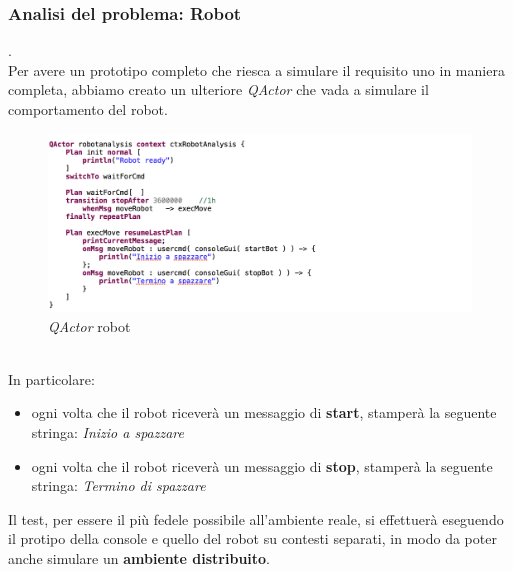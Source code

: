 \documentclass{llncs}
\newcommand{\qa}{\textsf{\textit{QActor }}}
\begin{document}
\subsubsection{Analisi del problema: Robot} .
\label{AnalisidelproblemaReq1Robot}
\vspace*{1ex}
\\
Per avere un prototipo completo che riesca a simulare il requisito uno in maniera completa, abbiamo creato un ulteriore \qa che vada a simulare il comportamento del robot.\\
\begin{figure}
    \centering
    \includegraphics[width=1\textwidth]{Immagini/Robot(requisito1).png}
    \caption{\qa robot}
    \label{fig:my_label}
\end{figure}
\vspace*{1ex}
\\
In particolare:
\begin{itemize}
    \item ogni volta che il robot ricever\`a un messaggio di \textbf{start}, stamper\`a la seguente stringa: \textit{Inizio a spazzare}
    \item ogni volta che il robot ricever\`a un messaggio di \textbf{stop}, stamper\`a la seguente stringa:
    \textit{Termino di spazzare}
\end{itemize}
Il test, per essere il pi\`u fedele possibile all'ambiente reale, si effettuer\`a eseguendo il protipo della console e quello del robot su contesti separati, in modo da poter anche simulare un \textbf{ambiente distribuito}. 

\pagebreak
\end{document}
